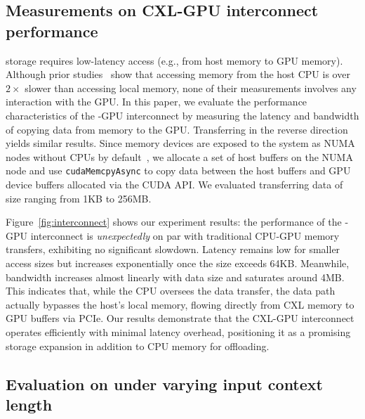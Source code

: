 \subsection{Measurements on CXL-GPU interconnect performance}
\label{sec:eval:connect}

\kvcache storage requires low-latency access (e.g., from host memory to GPU memory). 
Although prior studies~\cite{cxl1, cxl2} show that accessing \cxl memory from the host CPU is over $2\times$ slower than accessing local memory, none of their measurements involves any interaction with the GPU. 
In this paper, we evaluate the performance characteristics of the \cxl-GPU interconnect by measuring the latency and bandwidth of copying data from \cxl memory to the GPU. Transferring in the reverse direction yields similar results.
Since \cxl memory devices are exposed to the system as NUMA nodes without CPUs by default~\cite{cxl2}, we allocate a set of host buffers on the \cxl NUMA node and use \texttt{cudaMemcpyAsync} to copy data between the host buffers and GPU device buffers allocated via the CUDA API. 
We evaluated transferring data of size ranging from 1KB to 256MB.

Figure~\ref{fig:interconnect} shows our experiment results: the performance of the \cxl-GPU interconnect is \textit{unexpectedly} on par with traditional CPU-GPU memory transfers, exhibiting no significant slowdown. 
Latency remains low for smaller access sizes but increases exponentially once the size exceeds 64KB. 
Meanwhile, bandwidth increases almost linearly with data size and saturates around 4MB. 
This indicates that, while the CPU oversees the data transfer, the data path actually bypasses the host's local memory, flowing directly from CXL memory to GPU buffers via PCIe.
Our results demonstrate that the CXL-GPU interconnect operates efficiently with minimal latency overhead, positioning it as a promising storage expansion in addition to CPU memory for \kvcache{} offloading.

\subsection{Evaluation on \ttft under varying input context length}
\label{sec:eval:ttft}

